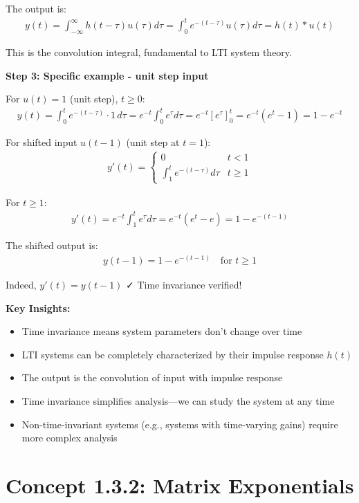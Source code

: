 \documentclass[11pt,a4paper]{article}
\begin{document}
The output is:
\begin{align}
y(t) = \int_{-\infty}^{\infty} h(t-\tau)u(\tau) d\tau = \int_0^t e^{-(t-\tau)} u(\tau) d\tau = h(t) * u(t)
\end{align}

This is the convolution integral, fundamental to LTI system theory.

\textbf{Step 3: Specific example - unit step input}

For $u(t) = 1$ (unit step), $t \geq 0$:
\begin{align}
y(t) = \int_0^t e^{-(t-\tau)} \cdot 1\, d\tau = e^{-t} \int_0^t e^{\tau} d\tau = e^{-t}[e^{\tau}]_0^t = e^{-t}(e^t - 1) = 1 - e^{-t}
\end{align}

For shifted input $u(t - 1)$ (unit step at $t = 1$):
\begin{align}
y'(t) = \begin{cases}
0 & t < 1 \\
\int_1^t e^{-(t-\tau)} d\tau & t \geq 1
\end{cases}
\end{align}

For $t \geq 1$:
\begin{align}
y'(t) = e^{-t}\int_1^t e^{\tau} d\tau = e^{-t}(e^t - e) = 1 - e^{-(t-1)}
\end{align}

The shifted output is:
\begin{align}
y(t-1) = 1 - e^{-(t-1)} \quad \text{for } t \geq 1
\end{align}

Indeed, $y'(t) = y(t-1)$ ✓ Time invariance verified!

\textbf{Key Insights:}
\begin{itemize}
\item Time invariance means system parameters don't change over time
\item LTI systems can be completely characterized by their impulse response $h(t)$
\item The output is the convolution of input with impulse response
\item Time invariance simplifies analysis—we can study the system at any time
\item Non-time-invariant systems (e.g., systems with time-varying gains) require more complex analysis
\end{itemize}

\section{Concept 1.3.2: Matrix Exponentials}
\end{document}
